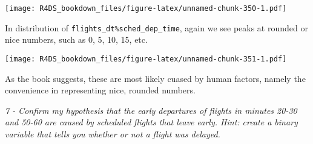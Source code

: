 \documentclass[]{article}
\newenvironment{Shaded}{\begin{snugshade}}{\end{snugshade}}
\newcommand{\KeywordTok}[1]{\textcolor[rgb]{0.13,0.29,0.53}{\textbf{#1}}}
\newcommand{\DataTypeTok}[1]{\textcolor[rgb]{0.13,0.29,0.53}{#1}}
\newcommand{\DecValTok}[1]{\textcolor[rgb]{0.00,0.00,0.81}{#1}}
\newcommand{\StringTok}[1]{\textcolor[rgb]{0.31,0.60,0.02}{#1}}
\newcommand{\OperatorTok}[1]{\textcolor[rgb]{0.81,0.36,0.00}{\textbf{#1}}}
\newcommand{\NormalTok}[1]{#1}
\theoremstyle{definition}
\theoremstyle{definition}
\theoremstyle{definition}
\theoremstyle{remark}
\begin{document}
\texttt{[image: R4DS\_bookdown\_files/figure-latex/unnamed-chunk-350-1.pdf]}

In distribution of \texttt{flights\_dt\%sched\_dep\_time}, again we see
peaks at rounded or nice numbers, such as 0, 5, 10, 15, etc.

\begin{Shaded}
\end{Shaded}

\texttt{[image: R4DS\_bookdown\_files/figure-latex/unnamed-chunk-351-1.pdf]}

As the book suggests, these are most likely cuased by human factors,
namely the convenience in representing nice, rounded numbers.

\emph{7 - Confirm my hypothesis that the early departures of flights in
minutes 20-30 and 50-60 are caused by scheduled flights that leave
early. Hint: create a binary variable that tells you whether or not a
flight was delayed.}
\end{document}
